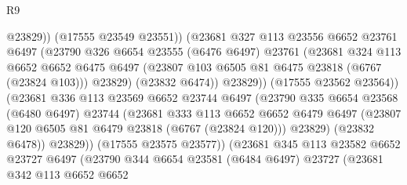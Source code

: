 \begin{lexlean}{R9}
\begin{coremodule}
{{{{{{{{{{{{{{{{{{{{{{{{{{{{{{{{{{{{{{{{{{{{{{{{{{{{{{{{{{{{{{{{{{{{{{{{{{{{{{{{{{{{                                  @23829))
                              (@17555 @23549 @23551))
                            (@23681
                              @327
                              @113
                              @23556
                              @6652
                              @23761
                              @6497
                              (@23790
                                @326
                                @6654
                                @23555
                                (@6476 @6497)
                                @23761
                                (@23681
                                  @324
                                  @113
                                  @6652
                                  @6652
                                  @6475
                                  @6497
                                  (@23807 @103 @6505 @81 @6475 @23818 (@6767 (@23824 @103)))
                                  @23829)
                                (@23832 @6474))
                              @23829))
                          (@17555 @23562 @23564))
                        (@23681
                          @336
                          @113
                          @23569
                          @6652
                          @23744
                          @6497
                          (@23790
                            @335
                            @6654
                            @23568
                            (@6480 @6497)
                            @23744
                            (@23681
                              @333
                              @113
                              @6652
                              @6652
                              @6479
                              @6497
                              (@23807 @120 @6505 @81 @6479 @23818 (@6767 (@23824 @120)))
                              @23829)
                            (@23832 @6478))
                          @23829))
                      (@17555 @23575 @23577))
                    (@23681
                      @345
                      @113
                      @23582
                      @6652
                      @23727
                      @6497
                      (@23790
                        @344
                        @6654
                        @23581
                        (@6484 @6497)
                        @23727
                        (@23681
                          @342
                          @113
                          @6652
                          @6652
}}}}}}}}}}}}}}}}}}}}}}}}}}}}}}}}}}}}}}}}}}}}}}}}}}}}}}}}}}}}}}}}}}}}}}}}}}}}}}}}}}}}
\end{coremodule}
\end{lexlean}
